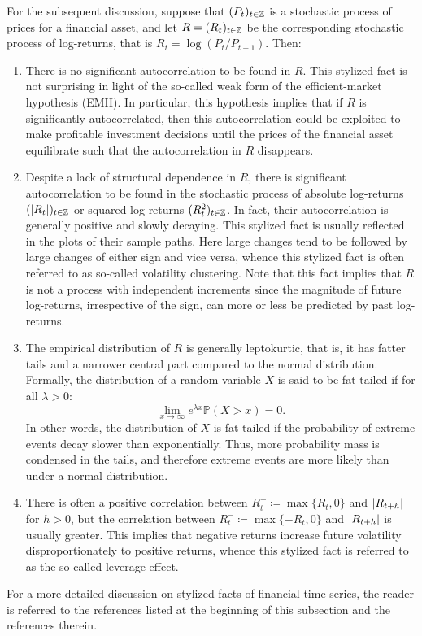 For the subsequent discussion, suppose that $(P_{t})_{t\in\mathbb{Z}}$ is a stochastic process of prices for a financial asset, and let $R=(R_{t})_{t\in\mathbb{Z}}$ be the corresponding stochastic process of log-returns, that is $R_{t}=\log(P_{t}/P_{t-1})$. Then:
\begin{enumerate}[label=(\roman*)]
    \item There is no significant autocorrelation to be found in $R$. This stylized fact is not surprising in light of the so-called weak form of the efficient-market hypothesis (EMH). In particular, this hypothesis implies that if $R$ is significantly autocorrelated, then this autocorrelation could be exploited to make profitable investment decisions until the prices of the financial asset equilibrate such that the autocorrelation in $R$ disappears.
    
    \item Despite a lack of structural dependence in $R$, there is significant autocorrelation to be found in the stochastic process of absolute log-returns $(\lvert R_{t}\rvert)_{t\in\mathbb{Z}}$ or squared log-returns $(R_{t}^{2})_{t\in\mathbb{Z}}$. In fact, their autocorrelation is generally positive and slowly decaying. This stylized fact is usually reflected in the plots of their sample paths. Here large changes tend to be followed by large changes of either sign and vice versa, whence this stylized fact is often referred to as so-called volatility clustering. Note that this fact implies that $R$ is not a process with independent increments since the magnitude of future log-returns, irrespective of the sign, can more or less be predicted by past log-returns.%

    \item The empirical distribution of $R$ is generally leptokurtic, that is, it has fatter tails and a narrower central part compared to the normal distribution. Formally, the distribution of a random variable $X$ is said to be fat-tailed if for all $\lambda >0$:
    \begin{equation}
        \lim_{x\to \infty}e^{\lambda x}\mathbb{P}\left(X>x\right)=0.
    \end{equation}
    In other words, the distribution of $X$ is fat-tailed if the probability of extreme events decay slower than exponentially. Thus, more probability mass is condensed in the tails, and therefore extreme events are more likely than under a normal distribution. 
    
    \item There is often a positive correlation between $R_{t}^{+}\coloneqq\max\{R_{t},0\}$ and $\lvert R_{t+h}\rvert$ for $h>0$, but the correlation between $R_{t}^{-}\coloneqq\max\{-R_{t},0\}$ and $\lvert R_{t+h}\rvert$ is usually greater. This implies that negative returns increase future volatility disproportionately to positive returns, whence this stylized fact is referred to as the so-called leverage effect.
\end{enumerate}
For a more detailed discussion on stylized facts of financial time series, the reader is referred to the references listed at the beginning of this subsection and the references therein.

